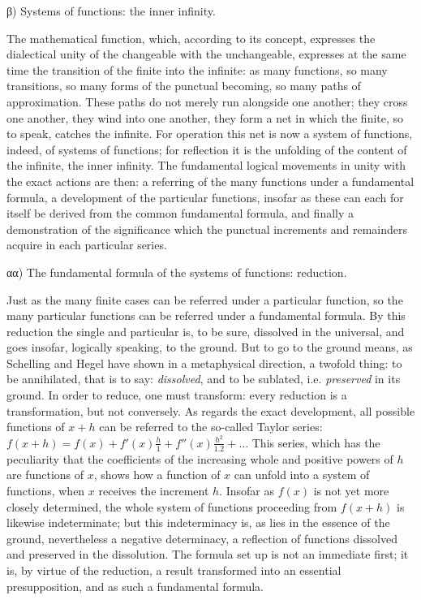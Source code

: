 \documentclass[12pt,a4paper,openany]{book}
\newcommand{\opage}[1]{\marginnote{\footnotesize\textit{[#1]}}}
\begin{document}
\begin{center}β) Systems of functions: the inner infinity.\end{center}

The mathematical function, which, according to its concept, expresses the dialectical unity of the changeable with the unchangeable, expresses at the same time the transition of the finite into the infinite: as many functions, so many transitions, so many forms of the punctual becoming, so many paths of approximation. These paths do not merely run alongside one another; they cross one another, they wind into one another, they form a net in which the finite, so to speak, catches the infinite. For operation this net is now a system of functions, indeed, of systems of functions; for reflection it is the unfolding of the content of the infinite, the inner infinity. The fundamental logical movements in unity with the exact actions are then: a referring of the many functions under a fundamental formula, a development of the particular functions, insofar as these can each for itself be derived from the common fundamental formula, and finally a
\setcounter{footnote}{0}%
\opage{49}demonstration of the significance which the punctual increments and remainders acquire in each particular series.

\begin{center}αα) The fundamental formula of the systems of functions: reduction.\end{center}

Just as the many finite cases can be referred under a particular function, so the many particular functions can be referred under a fundamental formula. By this reduction the single and particular is, to be sure, dissolved in the universal, and goes insofar, logically speaking, to the ground. But to go to the ground means, as Schelling and Hegel have shown in a metaphysical direction, a twofold thing: to be annihilated, that is to say: \emph{dissolved}, and to be sublated, i.e. \emph{preserved} in its ground. In order to reduce, one must transform: every reduction is a transformation, but not conversely. As regards the exact development, all possible functions of $x+h$ can be referred to the so-called Taylor series: $f(x+h)=f(x)+f'(x)\frac{h}{1}+f''(x)\frac{h^{2}}{1.2}+\ldots$ This series, which has the peculiarity that the coefficients of the increasing whole and positive powers of $h$ are functions of $x$, shows how a function of $x$ can unfold into a system of functions, when $x$ receives the increment $h$. Insofar as $f(x)$ is not yet more closely determined, the whole system of functions proceeding from $f(x+h)$ is likewise indeterminate; but this indeterminacy is, as lies in the essence of the ground, nevertheless a negative determinacy, a reflection of functions dissolved and preserved in the dissolution. The formula set up is not an immediate first; it is, by virtue of the reduction, a result transformed into an essential presupposition, and as such a fundamental formula.
\end{document}
